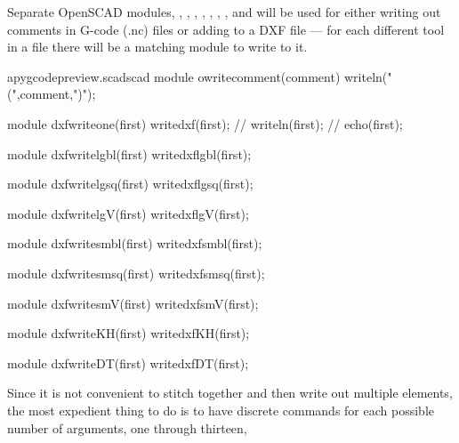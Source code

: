 \documentclass{ltxdoc}
\begin{document}
Separate OpenSCAD modules, 
, 
, 
, 
, 
, 
, 
, and
will be used for either writing out comments in G-code (.nc) files or adding to a DXF file --- for each different tool in a file there will be a matching module to write to it.
 
\lstset{firstnumber=\thepyscad}
\begin{writecode}{a}{pygcodepreview.scad}{scad}
module owritecomment(comment) {
    writeln("(",comment,")");
}

module dxfwriteone(first) {
    writedxf(first);
//    writeln(first);
//    echo(first);
}

module dxfwritelgbl(first) {
    writedxflgbl(first);
}

module dxfwritelgsq(first) {
    writedxflgsq(first);
}

module dxfwritelgV(first) {
    writedxflgV(first);
}

module dxfwritesmbl(first) {
    writedxfsmbl(first);
}

module dxfwritesmsq(first) {
    writedxfsmsq(first);
}

module dxfwritesmV(first) {
    writedxfsmV(first);
}

module dxfwriteKH(first) {
    writedxfKH(first);
}

module dxfwriteDT(first) {
    writedxfDT(first);
}

\end{writecode}
\addtocounter{pyscad}{42}
%

Since it is not convenient to stitch together and then write out multiple elements, the most expedient thing to do is to have discrete commands for each possible number of arguments, one through thirteen, 
 
\end{document}
